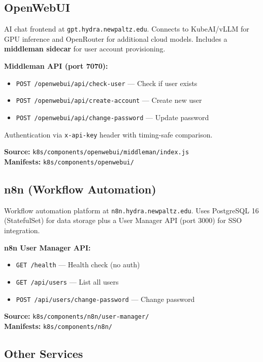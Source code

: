 \documentclass[11pt,a4paper]{article}
\begin{document}
\subsection{OpenWebUI}

AI chat frontend at \texttt{gpt.hydra.newpaltz.edu}. Connects to KubeAI/vLLM for GPU inference and OpenRouter for additional cloud models. Includes a \textbf{middleman sidecar} for user account provisioning.

\textbf{Middleman API (port 7070):}
\begin{itemize}[nosep]
    \item \texttt{POST /openwebui/api/check-user} --- Check if user exists
    \item \texttt{POST /openwebui/api/create-account} --- Create new user
    \item \texttt{POST /openwebui/api/change-password} --- Update password
\end{itemize}

Authentication via \texttt{x-api-key} header with timing-safe comparison.

\textbf{Source:} \texttt{k8s/components/openwebui/middleman/index.js}\\
\textbf{Manifests:} \texttt{k8s/components/openwebui/}

\subsection{n8n (Workflow Automation)}

Workflow automation platform at \texttt{n8n.hydra.newpaltz.edu}. Uses PostgreSQL 16 (StatefulSet) for data storage plus a User Manager API (port 3000) for SSO integration.

\textbf{n8n User Manager API:}
\begin{itemize}[nosep]
    \item \texttt{GET /health} --- Health check (no auth)
    \item \texttt{GET /api/users} --- List all users
    \item \texttt{POST /api/users/change-password} --- Change password
\end{itemize}

\textbf{Source:} \texttt{k8s/components/n8n/user-manager/}\\
\textbf{Manifests:} \texttt{k8s/components/n8n/}

\subsection{Other Services}
\end{document}
